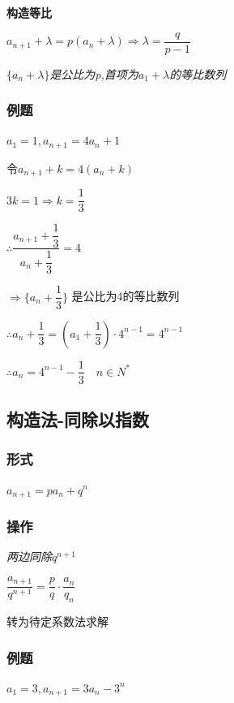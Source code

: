 \documentclass[10pt,cn]{elegantbook}
\begin{document}
    \textbf{   构造等比}
    
    $a_{n+1}+ \lambda = p(a_{n}+ \lambda)  \Rightarrow \lambda =\dfrac{q}{p-1}$
    
\textit{    $\{a_{n}+\lambda \}$是公比为p,首项为$a_{1}+\lambda $的等比数列}

      \subsubsection*{例题}
      
      $a_{1}=1,a_{n+1}= 4 a_{n} +1$
      
      \begin{tcolorbox}[colback=yellow!10!white, colframe=red!50!black]
      
      令$a_{n+1}+k=4(a_{n}+k)$
      
      $3k=1 \Rightarrow k=\dfrac{1}{3}$
      
     $ \therefore \dfrac{a_{n+1}+\dfrac{1}{3}}{a_{n}+\dfrac{1}{3}}=4$
     
     $\Rightarrow \{a_{n}+\dfrac{1}{3}\}$ 是公比为4的等比数列
     
     $\therefore a_{n}+\dfrac{1}{3}=(a_{1}+\dfrac{1}{3}) \cdot 4^{n-1}=4^{n-1}$
     
     $\therefore a_{n}=4^{n-1}-\dfrac{1}{3} \quad n \in N^{*}$
      \end{tcolorbox}

     \subsection{构造法-同除以指数}
\subsubsection*{形式}
$a_{n+1}=p a_{n} + q^{n}$

\subsubsection*{操作}

\textit{两边同除$q^{n+1}$}

$\dfrac{a_{n+1}}{q^{n+1}}=\dfrac{p}{q}\cdot \dfrac{a_{n}}{q_{n}}$

转为待定系数法求解

\subsubsection*{例题}

$a_{1}=3,a_{n+1}= 3 a_{n} -3^{n}$
\end{document}
